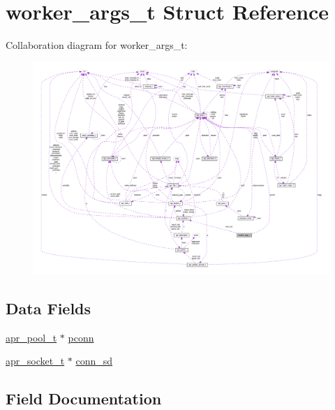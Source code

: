 \hypertarget{structworker__args__t}{}\section{worker\+\_\+args\+\_\+t Struct Reference}
\label{structworker__args__t}


Collaboration diagram for worker\+\_\+args\+\_\+t\+:
\nopagebreak
\begin{figure}[H]
\begin{center}
\leavevmode
\includegraphics[width=350pt]{structworker__args__t__coll__graph}
\end{center}
\end{figure}
\subsection*{Data Fields}
\begin{DoxyCompactItemize}
\item 
\hyperlink{structapr__pool__t}{apr\+\_\+pool\+\_\+t} $\ast$ \hyperlink{structworker__args__t_a6f72d346f84cadc4a59adadd0d18cf9b}{pconn}
\item 
\hyperlink{structapr__socket__t}{apr\+\_\+socket\+\_\+t} $\ast$ \hyperlink{structworker__args__t_afeb0abf3febce8e8f6e794be55b8a0b2}{conn\+\_\+sd}
\end{DoxyCompactItemize}


\subsection{Field Documentation}
